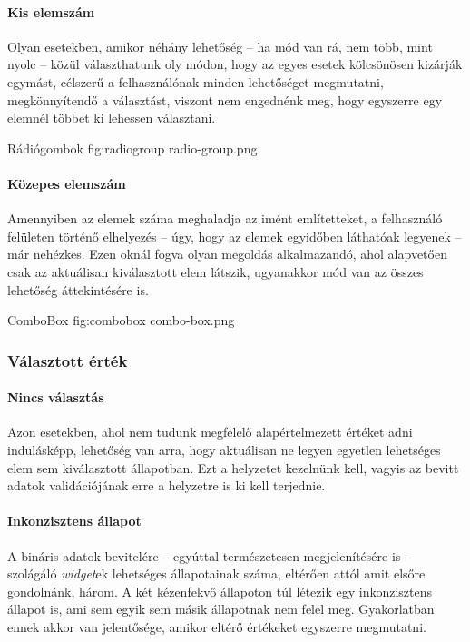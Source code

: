 \paragraph{Kis elemszám}

Olyan esetekben, amikor néhány lehetőség -- ha mód van rá, nem több, mint nyolc -- közül választhatunk oly módon, hogy az egyes esetek kölcsönösen kizárják egymást, célszerű a felhasználónak minden lehetőséget megmutatni, megkönnyítendő a választást, viszont nem engednénk meg, hogy egyszerre egy elemnél többet ki lehessen választani.

{Rádiógombok\cite{gtkref}}
{fig:radiogroup}
{radio-group.png}

\paragraph{Közepes elemszám}

Amennyiben az elemek száma meghaladja az imént említetteket, a felhasználó felületen történő elhelyezés -- úgy, hogy az elemek egyidőben láthatóak legyenek -- már nehézkes. Ezen oknál fogva olyan megoldás alkalmazandó, ahol alapvetően csak az aktuálisan kiválasztott elem látszik, ugyanakkor mód van az összes lehetőség áttekintésére is.

{ComboBox\cite{gtkref}}
{fig:combobox}
{combo-box.png}

\subsubsection{Választott érték}

\paragraph{Nincs választás}

Azon esetekben, ahol nem tudunk megfelelő alapértelmezett értéket adni indulásképp, lehetőség van arra, hogy aktuálisan ne legyen egyetlen lehetséges elem sem kiválasztott állapotban. Ezt a helyzetet kezelnünk kell, vagyis az bevitt adatok validációjának erre a helyzetre is ki kell terjednie.

\paragraph{Inkonzisztens állapot}
\label{sec:toggleinconsistent}

A bináris adatok bevitelére -- egyúttal természetesen megjelenítésére is -- szolágáló \textit{widget}ek lehetséges állapotainak száma, eltérően attól amit elsőre gondolnánk, három. A két kézenfekvő állapoton túl létezik egy inkonzisztens állapot is, ami sem egyik sem másik állapotnak nem felel meg. Gyakorlatban ennek akkor van jelentősége, amikor eltérő értékeket egyszerre megmutatni.

